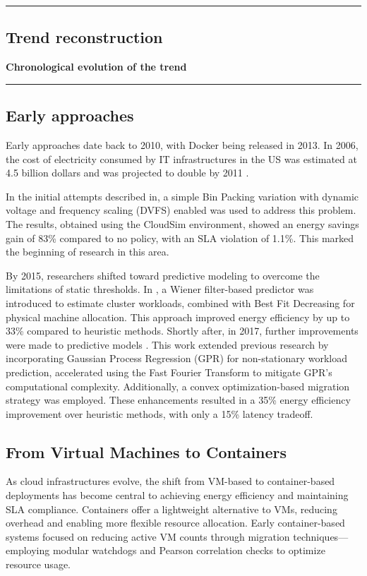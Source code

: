{\color{gray}\hrule}
\begin{center}
\section{Trend reconstruction}
\textbf{Chronological evolution of the trend}
\bigskip
\end{center}
{\color{gray}\hrule}
\begin{multicols}{2}
\subsection{Early approaches}
Early approaches date back to 2010, with Docker being released in 2013. In 2006, the cost of electricity consumed by IT infrastructures in the US was estimated at 4.5 billion dollars and was projected to double by 2011 \cite{beloglazov_energy_2010}.

In the initial attempts described in\cite{beloglazov_energy_2010}, a simple Bin Packing variation with dynamic voltage and frequency scaling (DVFS) enabled was used to address this problem. The results, obtained using the CloudSim environment, showed an energy savings gain of 83\% compared to no policy, with an SLA violation of 1.1\%. This marked the beginning of research in this area.

By 2015, researchers shifted toward predictive modeling to overcome the limitations of static thresholds. In \cite{dabbagh_energy-efficient_2015},
a Wiener filter-based predictor was introduced to estimate cluster workloads, 
combined with Best Fit Decreasing for physical machine allocation.
This approach improved energy efficiency by up to 33\% compared to heuristic methods.
Shortly after, in 2017, further improvements were made to predictive models \cite{bui_energy_2017}.
This work extended previous research by incorporating Gaussian Process Regression (GPR) for non-stationary workload prediction,
accelerated using the Fast Fourier Transform to mitigate GPR's computational complexity.
Additionally, a convex optimization-based migration strategy was employed.
These enhancements resulted in a 35\% energy efficiency improvement over heuristic methods, with only a 15\% latency tradeoff.

\subsection{From Virtual Machines to Containers}

As cloud infrastructures evolve, the shift from VM-based to container-based deployments has become central to achieving energy efficiency and maintaining SLA compliance. Containers offer a lightweight alternative to VMs, reducing overhead and enabling more flexible resource allocation\cite{alahmad_availability-aware_2018}. Early container-based systems focused on reducing active VM counts through migration techniques—employing modular watchdogs and Pearson correlation checks to optimize resource usage\cite{alahmad_availability-aware_2018}.


\end{multicols}
